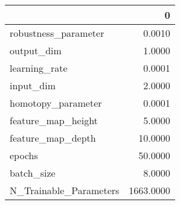 \begin{tabular}{lr}
\toprule
{} &          0 \\
\midrule
robustness\_parameter   &     0.0010 \\
output\_dim             &     1.0000 \\
learning\_rate          &     0.0001 \\
input\_dim              &     2.0000 \\
homotopy\_parameter     &     0.0001 \\
feature\_map\_height     &     5.0000 \\
feature\_map\_depth      &    10.0000 \\
epochs                 &    50.0000 \\
batch\_size             &     8.0000 \\
N\_Trainable\_Parameters &  1663.0000 \\
\bottomrule
\end{tabular}
